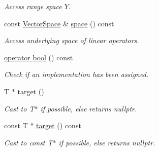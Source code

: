 \begin{DoxyCompactItemize}
\begin{DoxyCompactList}\small\item\em Access range space $Y$. \end{DoxyCompactList}\item 
\hypertarget{classSpacy_1_1DynamicLinearOperator_afde64039ceab0ad8752bce3ac2187a41}{}const \hyperlink{classSpacy_1_1VectorSpace}{Vector\+Space} \& \hyperlink{classSpacy_1_1DynamicLinearOperator_afde64039ceab0ad8752bce3ac2187a41}{space} () const \label{classSpacy_1_1DynamicLinearOperator_afde64039ceab0ad8752bce3ac2187a41}

\begin{DoxyCompactList}\small\item\em Access underlying space of linear operators. \end{DoxyCompactList}\item 
\hypertarget{classSpacy_1_1DynamicLinearOperator_a59e9adc667b95f85c927d359f11e0ed6}{}\hyperlink{classSpacy_1_1DynamicLinearOperator_a59e9adc667b95f85c927d359f11e0ed6}{operator bool} () const \label{classSpacy_1_1DynamicLinearOperator_a59e9adc667b95f85c927d359f11e0ed6}

\begin{DoxyCompactList}\small\item\em Check if an implementation has been assigned. \end{DoxyCompactList}\item 
\hypertarget{structSpacy_1_1Mixin_1_1ToTarget_a3510786172c63a074eda127276d13392}{}T $\ast$ \hyperlink{structSpacy_1_1Mixin_1_1ToTarget_a3510786172c63a074eda127276d13392}{target} ()\label{structSpacy_1_1Mixin_1_1ToTarget_a3510786172c63a074eda127276d13392}

\begin{DoxyCompactList}\small\item\em Cast to T$\ast$ if possible, else returns nullptr. \end{DoxyCompactList}\item 
\hypertarget{structSpacy_1_1Mixin_1_1ToTarget_a98985b22f6fc98d253c8416c54a5e359}{}const T $\ast$ \hyperlink{structSpacy_1_1Mixin_1_1ToTarget_a98985b22f6fc98d253c8416c54a5e359}{target} () const\label{structSpacy_1_1Mixin_1_1ToTarget_a98985b22f6fc98d253c8416c54a5e359}

\begin{DoxyCompactList}\small\item\em Cast to const T$\ast$ if possible, else returns nullptr. \end{DoxyCompactList}\end{DoxyCompactItemize}
